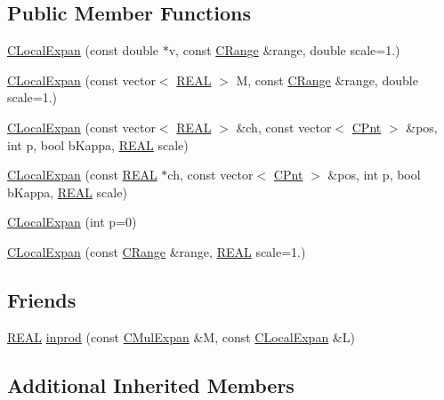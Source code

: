 \subsection*{Public Member Functions}
\begin{DoxyCompactItemize}
\item 
\hyperlink{classCLocalExpan_a16c516c3997efee3e4db44e826af7a74}{C\-Local\-Expan} (const double $\ast$v, const \hyperlink{classCRange}{C\-Range} \&range, double scale=1.)
\item 
\hyperlink{classCLocalExpan_a1d8189f26cb590dbf2ed84724784277a}{C\-Local\-Expan} (const vector$<$ \hyperlink{util_8h_a5821460e95a0800cf9f24c38915cbbde}{R\-E\-A\-L} $>$ M, const \hyperlink{classCRange}{C\-Range} \&range, double scale=1.)
\item 
\hyperlink{classCLocalExpan_aecedf22ca8c5169f0c064b0b5a7e772d}{C\-Local\-Expan} (const vector$<$ \hyperlink{util_8h_a5821460e95a0800cf9f24c38915cbbde}{R\-E\-A\-L} $>$ \&ch, const vector$<$ \hyperlink{classCPnt}{C\-Pnt} $>$ \&pos, int p, bool b\-Kappa, \hyperlink{util_8h_a5821460e95a0800cf9f24c38915cbbde}{R\-E\-A\-L} scale)
\item 
\hyperlink{classCLocalExpan_aefec98860c64c14640ff7c1099687ced}{C\-Local\-Expan} (const \hyperlink{util_8h_a5821460e95a0800cf9f24c38915cbbde}{R\-E\-A\-L} $\ast$ch, const vector$<$ \hyperlink{classCPnt}{C\-Pnt} $>$ \&pos, int p, bool b\-Kappa, \hyperlink{util_8h_a5821460e95a0800cf9f24c38915cbbde}{R\-E\-A\-L} scale)
\item 
\hyperlink{classCLocalExpan_a70a4260de05dfbc5a98e0660e10269ce}{C\-Local\-Expan} (int p=0)
\item 
\hyperlink{classCLocalExpan_a09cdbca66aa809acd1a4dc15387982f1}{C\-Local\-Expan} (const \hyperlink{classCRange}{C\-Range} \&range, \hyperlink{util_8h_a5821460e95a0800cf9f24c38915cbbde}{R\-E\-A\-L} scale=1.)
\end{DoxyCompactItemize}
\subsection*{Friends}
\begin{DoxyCompactItemize}
\item 
\hyperlink{util_8h_a5821460e95a0800cf9f24c38915cbbde}{R\-E\-A\-L} \hyperlink{classCLocalExpan_a020c55be9514911fc8ecde0a8d81a919}{inprod} (const \hyperlink{classCMulExpan}{C\-Mul\-Expan} \&M, const \hyperlink{classCLocalExpan}{C\-Local\-Expan} \&L)
\end{DoxyCompactItemize}
\subsection*{Additional Inherited Members}


